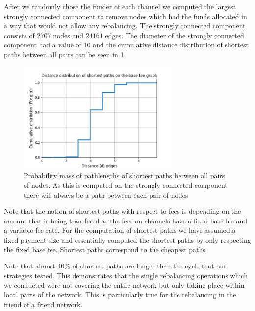 \documentclass[a4paper]{paper}
\begin{document}
After we randomly chose the funder of each channel we computed the largest strongly connected component to remove nodes which had the funds allocated in a way that would not allow any rebalancing.
The strongly connected component consists of $2707$ nodes and $24161$ edges.
The diameter of the strongly connected component had a value of 10 and the cumulative distance distribution of shortest paths between all pairs can be seen in \cref{fig:cumulative_distance}.
\begin{figure}
 \centering
 \includegraphics[width=8cm]{code/vs/fig/cummulative_distance_distribution_lin_scale.png}
 \caption{Probability mass of pathlengths of shortest paths between all pairs of nodes. As this is computed on the strongly connected component there will always be a path between each pair of nodes}
 \label{fig:cumulative_distance}
\end{figure}
Note that the notion of shortest paths with respect to fees is depending on the amount that is being transfered as the fees on channels have a fixed base fee and a variable fee rate.
For the computation of shortest paths we have assumed a fixed payment size and essentially computed the shortest paths by only respecting the fixed base fee.
Shortest paths correspond to the cheapest paths.

Note that almost $40\%$ of shortest paths are longer than the cycls that our strategies tested. 
This demonstrates that the single rebalancing operations which we conducted were not covering the entire network but only taking place within local parts of the network.
This is particularly true for the rebalancing in the friend of a friend network.
\end{document}

